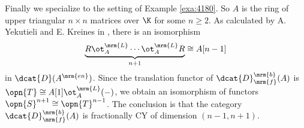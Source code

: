 \begin{exa}
Finally we specialize to the setting of Example \ref{exa:4180}.
So $A$ is the ring of upper triangular $n \times n$ matrices over $\K$ for some 
$n \geq 2$. As calculated by A. Yekutieli and E. Kreines in \cite{Ye4}, there 
is an isomorphism 
\[ \underbrace{R \ot^{\mrm{L}}_{A} \cdots \ot^{\mrm{L}}_{A} R}_{n + 1} 
\cong A[n - 1] \]
in $\dcat{D}(A^{\mrm{en}})$. Since the translation functor of
$\dcat{D}^{\mrm{b}}_{\mrm{f}}(A)$ is 
$\opn{T} \cong A[1] \ot^{\mrm{L}}_{A} (-)$, we obtain an isomorphism of 
functors $\opn{S}^{n + 1} \cong \opn{T}^{n - 1}$. 
The conclusion is that the category 
$\dcat{D}^{\mrm{b}}_{\mrm{f}}(A)$ is fractionally CY of dimension 
$(n - 1, n + 1)$.
\end{exa}






